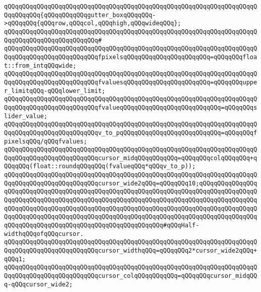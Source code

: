 \verb|qQQqqQQqqQQqqQQqqQQqqQQqqQQqqQQqqQQqqQQqqQQqqQQqqQQqqQQqqQQqqQQqqQQqqQQqqQQqqQQq{qQQqqQQqqQQqgutter_boxqQQqqQQq->qQQqqQQq{qQQqrow,qQQqcol,qQQqhigh,qQQqwideqQQq};|\newline
\verb|qQQqqQQqqQQqqQQqqQQqqQQqqQQqqQQqqQQqqQQqqQQqqQQqqQQqqQQqqQQqqQQqqQQqqQQqqQQqqQQqqQQqqQQqqQQqqQQq#|\newline
\verb|qQQqqQQqqQQqqQQqqQQqqQQqqQQqqQQqqQQqqQQqqQQqqQQqqQQqqQQqqQQqqQQqqQQqqQQqqQQqqQQqqQQqqQQqqQQqqQQqfpixelsqQQqqQQqqQQqqQQqqQQqqQQq=qQQqqQQqfloat::from_intqQQqwide;|\newline
\verb|qQQqqQQqqQQqqQQqqQQqqQQqqQQqqQQqqQQqqQQqqQQqqQQqqQQqqQQqqQQqqQQqqQQqqQQqqQQqqQQqqQQqqQQqqQQqqQQqfvaluesqQQqqQQqqQQqqQQqqQQqqQQq=qQQqqQQqupper_limitqQQq-qQQqlower_limit;|\newline
\verb|qQQqqQQqqQQqqQQqqQQqqQQqqQQqqQQqqQQqqQQqqQQqqQQqqQQqqQQqqQQqqQQqqQQqqQQqqQQqqQQqqQQqqQQqqQQqqQQqfvalueqQQqqQQqqQQqqQQqqQQqqQQqqQQq=qQQqqQQqslider_value;|\newline
\newline
\verb|qQQqqQQqqQQqqQQqqQQqqQQqqQQqqQQqqQQqqQQqqQQqqQQqqQQqqQQqqQQqqQQqqQQqqQQqqQQqqQQqqQQqqQQqqQQqqQQqv_to_pqQQqqQQqqQQqqQQqqQQqqQQqqQQq=qQQqqQQqfpixelsqQQq/qQQqfvalues;|\newline
\newline
\verb|qQQqqQQqqQQqqQQqqQQqqQQqqQQqqQQqqQQqqQQqqQQqqQQqqQQqqQQqqQQqqQQqqQQqqQQqqQQqqQQqqQQqqQQqqQQqqQQqcursor_midqQQqqQQqqQQq=qQQqqQQqcolqQQqqQQq+qQQqqQQq(float::roundqQQqqQQq(fvalueqQQq*qQQqv_to_p));|\newline
\newline
\verb|qQQqqQQqqQQqqQQqqQQqqQQqqQQqqQQqqQQqqQQqqQQqqQQqqQQqqQQqqQQqqQQqqQQqqQQqqQQqqQQqqQQqqQQqqQQqqQQqcursor_wide2qQQq=qQQqqQQq10;qQQqqQQqqQQqqQQqqQQqqQQqqQQqqQQqqQQqqQQqqQQqqQQqqQQqqQQqqQQqqQQqqQQqqQQqqQQqqQQqqQQqqQQqqQQqqQQqqQQqqQQqqQQqqQQqqQQqqQQqqQQqqQQqqQQqqQQqqQQqqQQqqQQqqQQqqQQqqQQqqQQqqQQqqQQqqQQqqQQqqQQqqQQqqQQqqQQqqQQqqQQqqQQqqQQqqQQqqQQqqQQqqQQqqQQqqQQqqQQqqQQqqQQqqQQqqQQqqQQqqQQqqQQqqQQqqQQqqQQqqQQqqQQqqQQqqQQqqQQqqQQqqQQqqQQqqQQqqQQqqQQqqQQqqQQqqQQqqQQq#qQQqHalf-widthqQQqofqQQqcursor.|\newline
\verb|qQQqqQQqqQQqqQQqqQQqqQQqqQQqqQQqqQQqqQQqqQQqqQQqqQQqqQQqqQQqqQQqqQQqqQQqqQQqqQQqqQQqqQQqqQQqqQQqcursor_widthqQQq=qQQqqQQq2*cursor_wide2qQQq+qQQq1;|\newline
\newline
\verb|qQQqqQQqqQQqqQQqqQQqqQQqqQQqqQQqqQQqqQQqqQQqqQQqqQQqqQQqqQQqqQQqqQQqqQQqqQQqqQQqqQQqqQQqqQQqqQQqcursor_colqQQqqQQqqQQq=qQQqqQQqcursor_midqQQq-qQQqcursor_wide2;|\newline
